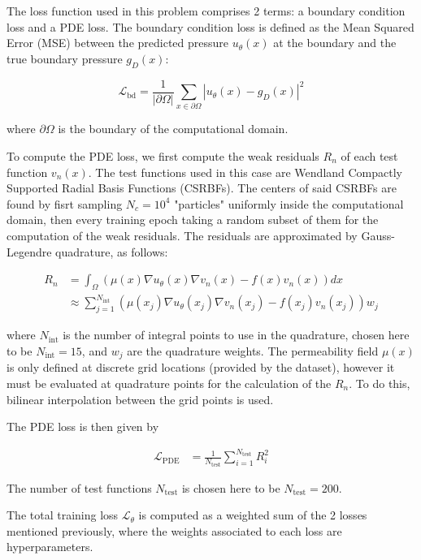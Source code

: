 The loss function used in this problem comprises 2 terms: a boundary condition loss and a PDE loss. The boundary condition loss is defined as the Mean Squared Error (MSE) between the predicted pressure $u_\theta(x)$ at the boundary and the true boundary pressure $g_D(x)$:

\begin{equation}
	\mathcal{L}_\mathrm{bd} = \frac{1}{\left| \partial\Omega \right|} \sum_{x\in\partial\Omega}^{} \left| u_\theta (x) - g_D(x) \right|^2
\end{equation}

\noindent
where $\partial\Omega$ is the boundary of the computational domain.

To compute the PDE loss, we first compute the weak residuals $R_n$ of each test function $v_n(x)$. The test functions used in this case are Wendland Compactly Supported Radial Basis Functions (CSRBFs). The centers of said CSRBFs are found by fisrt sampling $N_c = 10^4$ "particles" uniformly inside the computational domain, then every training epoch taking a random subset of them for the computation of the weak residuals. The residuals are approximated by Gauss-Legendre quadrature, as follows:

\begin{align}
	R_n &= \int_{\Omega} \left( \mu(x) \nabla u_\theta(x) \nabla v_n(x) - f(x) v_n(x) \right) dx \\
	&\approx \sum_{j=1}^{N_\mathrm{int}} \left( \mu (x_j) \nabla u_\theta(x_j) \nabla v_n(x_j) - f(x_j) v_n(x_j) \right) w_j
\end{align}

\noindent
where $N_\mathrm{int}$ is the number of integral points to use in the quadrature, chosen here to be $N_\mathrm{int} = 15$, and $w_j$ are the quadrature weights. The permeability field $\mu(x)$ is only defined at discrete grid locations (provided by the dataset), however it must be evaluated at quadrature points for the calculation of the $R_n$. To do this, bilinear interpolation between the grid points is used.

\newpage
The PDE loss is then given by

\begin{align}
	\mathcal{L}_\mathrm{PDE} &= \frac{1}{N_\mathrm{test}} \sum_{i=1}^{N_\mathrm{test}} R_i^2
\end{align}

The number of test functions $N_\mathrm{test}$ is chosen here to be $N_\mathrm{test} = 200$.

The total training loss $\mathcal{L}_\theta$ is computed as a weighted sum of the 2 losses mentioned previously, where the weights associated to each loss are hyperparameters.

